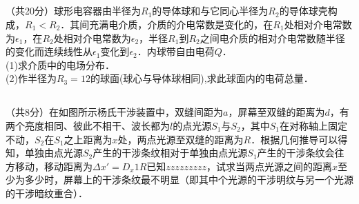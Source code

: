 \subsection{ }
（共20分）球形电容器由半径为$R_1$的导体球和与它同心半径为$R_2$的导体球壳构成，$R_1<R_2$．其间充满电介质，介质的介电常数是变化的，在$R_1$处相对介电常数为$\epsilon_1$，在$R_2$处相对介电常数为$\epsilon_2$，半径$R_1$到$R_2$之间电介质的相对介电常数随半径的变化而连续线性从$\epsilon_1$变化到$\epsilon_2$．内球带自由电荷$Q$．\\
(1)求介质中的电场分布．\\
(2)作半径为$R_{3}=12$的球面(球心与导体球相同),求此球面内的电荷总量．\\

\subsection{ }
（共8分）在如图所示杨氏干涉装置中，双缝间距为$a$，屏幕至双缝的距离为$d$，有两个亮度相同、彼此不相干、波长都为$l$的点光源$S_1$与$S_2$，其中$S_1$在对称轴上固定不动，$S_2$在$S_1$之上距离为$x$处，两点光源至双缝的距离为$R$．根据几何推导可以得知，单独由点光源$S_2$产生的干涉条纹相对于单独由点光源$S_1$产生的干涉条纹会往方移动，移动距离为$\Delta x'=D_{x}1R$已知$zzzzzzzzz$，试求当两点光源之间的距离$x$至少为多少时，屏幕上的干涉条纹最不明显（即其中个光源的干涉明纹与另一个光源的干涉暗纹重合）．